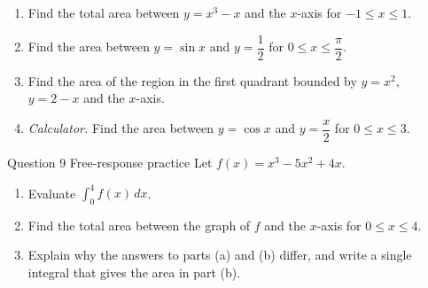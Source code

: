 \documentclass[11pt]{article}
\begin{document}
\begin{enumerate}[leftmargin=*,itemsep=2pt,start=5]
  \item Find the total area between $y=x^3-x$ and the $x$-axis for $-1\le x\le1$.\work{2.8cm}
  \item Find the area between $y=\sin x$ and $y=\dfrac12$ for $0\le x\le\dfrac\pi2$.\work{2.8cm}
  \item Find the area of the region in the first quadrant bounded by $y=x^2$, $y=2-x$ and the $x$-axis.\work{2.8cm}
  \item \emph{Calculator.} Find the area between $y=\cos x$ and $y=\dfrac x2$ for $0\le x\le3$.\work{2.8cm}
\end{enumerate}

\begin{frbox}{Question 9 \textperiodcentered{} Free-response practice}
Let $f(x)=x^3-5x^2+4x$.
\begin{enumerate}[label=(\alph*),leftmargin=*,itemsep=2pt]
  \item Evaluate $\displaystyle\int_{0}^{4}f(x)\,dx$.\work{2.6cm}
  \item Find the total area between the graph of $f$ and the $x$-axis for $0\le x\le4$.\work{2.6cm}
  \item Explain why the answers to parts (a) and (b) differ, and write a single integral that gives the area in part (b).\work{2.6cm}
\end{enumerate}
\end{frbox}
\end{document}
